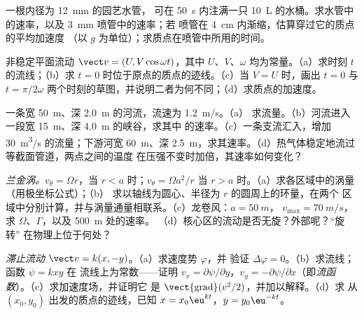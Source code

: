 \begin{exercise}[$\star\star$]\label{exo:b2:fluid-kinematics:5}
一根内径为 \qty{12}{mm} 的园艺水管，
可在 \qty{50}{s} 内注满一只 \qty{10}{L} 的水桶。求水管中的速率，以及 \qty{3}{mm} 喷管中的速率；若
喷管在 \qty{4}{cm} 内渐缩，估算穿过它的质点的平均加速度
（以 $g$ 为单位）；求质点在喷管中所用的时间。
\end{exercise}

\begin{exercise}[$\star\star$]\label{exo:b2:fluid-kinematics:6}
非稳定平面流动 $\vect v = (U, V\cos\omega t)$，其中 $U$、$V$、$\omega$
均为常量。（a）求时刻 $t$ 的流线；（b）求
$t = 0$ 时位于原点的质点的迹线。（c）当 $V = U$ 时，画出 $t = 0$ 与
$t = \pi/2\omega$ 两个时刻的草图，并说明二者为何不同；（d）求质点的加速度。
\end{exercise}

\begin{exercise}[$\star\star$]\label{exo:b2:fluid-kinematics:7}
一条宽 \qty{50}{m}、深 \qty{2.0}{m} 的河流，流速为 \qty{1.2}{m/s}。（a）
求流量。（b）河流进入一段宽 \qty{15}{m}、深 \qty{4.0}{m} 的峡谷，求其中
的速率。（c）一条支流汇入，增加 \qty{30}{m^3/s} 的流量；下游河宽
\qty{60}{m}、深 \qty{2.5}{m}，求其速率。（d）热气体稳定地流过
等截面管道，两点之间的温度
在压强不变时加倍，其速率如何变化？
\end{exercise}

\begin{exercise}[$\star\star$]\label{exo:b2:fluid-kinematics:8}
\emph{兰金涡。}$v_\theta = \Omega r$，当 $r < a$ 时；$v_\theta = \Omega a^2/r$
当 $r > a$ 时。（a）求各区域中的涡量（用极坐标公式）；（b）
求以轴线为圆心、半径为 $r$ 的圆周上的环量，在两个
区域中分别计算，并与涡量通量相联系。（c）龙卷风：$a = \qty{50}{m}$，
$v_{\max} = \qty{70}{m/s}$，求 $\Omega$、$\Gamma$，以及 \qty{500}{m} 处的速率。
（d）核心区的流动是否无旋？外部呢？“旋转”
在物理上位于何处？
\end{exercise}

\begin{exercise}[$\star\star$]\label{exo:b2:fluid-kinematics:9}
\emph{滞止流动} $\vect v = k(x, -y)$。（a）求速度势 $\varphi$，并
验证 $\Delta\varphi = 0$。（b）求流线；函数 $\psi = kxy$ 在
流线上为常数——证明 $v_x = \partial\psi/\partial y$，$v_y = -\partial\psi/
\partial x$（即\emph{流函数}）。（c）求加速度场，并证明它
是 $\operatorname{\vect{grad}}(v^2/2)$，并加以解释。（d）求
从 $(x_0, y_0)$ 出发的质点的迹线，已知 $x = x_0\eu^{kt}$，$y = y_0\eu^{-kt}$。
\end{exercise}

